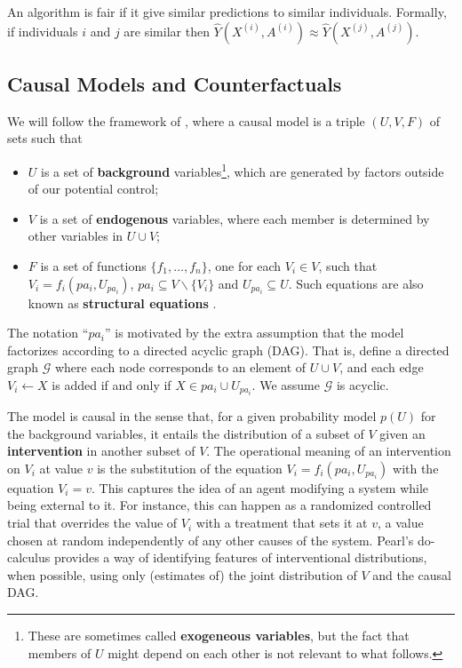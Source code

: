 \begin{define}
An algorithm is fair if it give similar predictions to similar individuals. Formally, if individuals $i$ and $j$ are similar then $\hat{Y}(X^{(i)}, A^{(i)}) \approx \hat{Y}(X^{(j)}, A^{(j)})$.
\end{define}


\subsection{Causal Models and Counterfactuals}
\label{subsec:cmc}
We will follow the framework of \cite{pearl:00}, where a causal
model is a triple $(U, V, F)$ of sets such that
\begin{itemize}
\item $U$ is a set of {\bf background} variables\footnote{These are
  sometimes called {\bf exogeneous variables}, but the fact that members of $U$
  might depend on each other is not relevant to what follows.}, which are generated by factors
outside of our potential control;
\item $V$ is a set of {\bf endogenous} variables, where each member is determined by
  other variables in $U \cup V$;
\item $F$ is a set of functions $\{f_1, \dots, f_n\}$, one for each $V_i \in V$, such
that $V_i = f_i(pa_i, U_{pa_i})$, $pa_i \subseteq V \backslash
\{V_i\}$ and $U_{pa_i} \subseteq U$. Such equations are also known as
{\bf structural equations} \citep{bol:89}.
\end{itemize}

The notation ``$pa_i$'' is motivated by the extra assumption that the
model factorizes according to a directed acyclic graph (DAG). That is,
define a directed graph $\mathcal G$ where each node corresponds to an
element of $U \cup V$, and each edge $V_i \leftarrow X$ is added if
and only if $X \in pa_i \cup U_{pa_i}$. We assume $\mathcal G$ is
acyclic.

The model is causal in the sense that, for a given probability model
$p(U)$ for the background variables, it entails the distribution of a
subset of $V$ given an {\bf intervention} in another subset of $V$.
The operational meaning of an intervention on $V_i$ at value $v$ is
the substitution of the equation $V_i = f_i(pa_i, U_{pa_i})$ with the
equation $V_i = v$. This captures the idea of an agent modifying a
system while being external to it. For instance, this can happen as a
randomized controlled trial that overrides the value of $V_i$ with a
treatment that sets it at $v$, a value chosen at random independently
of any other causes of the system. Pearl's do-calculus
\citep{pearl:00} provides a way of identifying features of 
interventional distributions, when possible, using only (estimates of) the joint
distribution of $V$ and the causal DAG.

